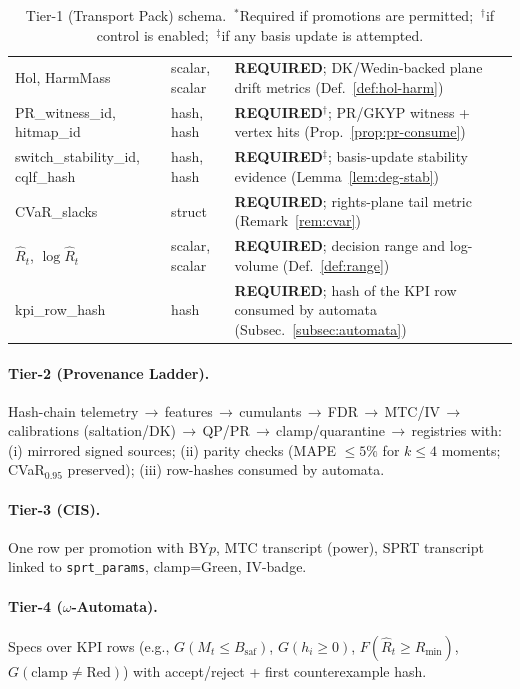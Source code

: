 \begin{table}[t]
\begin{tabularx}{\textwidth}{@{}>{\raggedright\arraybackslash}p{3.7cm} >{\raggedright\arraybackslash}p{2.9cm} >{\raggedright\arraybackslash}X@{}}
Hol, HarmMass & scalar, scalar & \textbf{REQUIRED}; DK/Wedin-backed plane drift metrics (Def.~\ref{def:hol-harm}) \\
PR\_witness\_id, hitmap\_id & hash, hash & \textbf{REQUIRED\(^\dagger\)}; PR/GKYP witness + vertex hits (Prop.~\ref{prop:pr-consume}) \\
switch\_stability\_id, cqlf\_hash & hash, hash & \textbf{REQUIRED\(^\ddagger\)}; basis-update stability evidence (Lemma~\ref{lem:deg-stab}) \\
CVaR\_slacks & struct & \textbf{REQUIRED}; rights-plane tail metric (Remark~\ref{rem:cvar}) \\
$\hat R_t$, $\log\hat R_t$ & scalar, scalar & \textbf{REQUIRED}; decision range and log-volume (Def.~\ref{def:range}) \\
kpi\_row\_hash & hash & \textbf{REQUIRED}; hash of the KPI row consumed by automata (Subsec.~\ref{subsec:automata}) \\
\bottomrule
\end{tabularx}
\caption{Tier-1 (Transport Pack) schema. \(\ ^\ast\)Required if promotions are permitted; \(\ ^\dagger\)if control is enabled; \(\ ^\ddagger\)if any basis update is attempted.}
\label{tab:tier1-schema}
\end{table}

\paragraph{Tier-2 (Provenance Ladder).}
Hash-chain telemetry\,$\rightarrow$\,features\,$\rightarrow$\,cumulants\,$\rightarrow$\,FDR\,$\rightarrow$\,MTC/IV\,$\rightarrow$\,calibrations (saltation/DK)\,$\rightarrow$\,QP/PR\,$\rightarrow$\,clamp/quarantine\,$\rightarrow$\,registries with: (i) mirrored signed sources; (ii) parity checks (MAPE \(\le 5\%\) for \(k\!\le\!4\) moments; CVaR\(_{0.95}\) preserved); (iii) row-hashes consumed by automata. 

\paragraph{Tier-3 (CIS).}
One row per promotion with BY\-\(p\), MTC transcript (power), SPRT transcript linked to \texttt{sprt\_params}, clamp=Green, IV-badge. 

\paragraph{Tier-4 ($\omega$-Automata).}
Specs over KPI rows (e.g., \(G(M_t\!\le\!B_{\mathrm{saf}})\), \(G(h_i\!\ge\!0)\), \(F(\hat R_t\!\ge\!R_{\min})\), \(G(\text{clamp}\neq\text{Red})\)) with accept/reject + first counterexample hash. 

